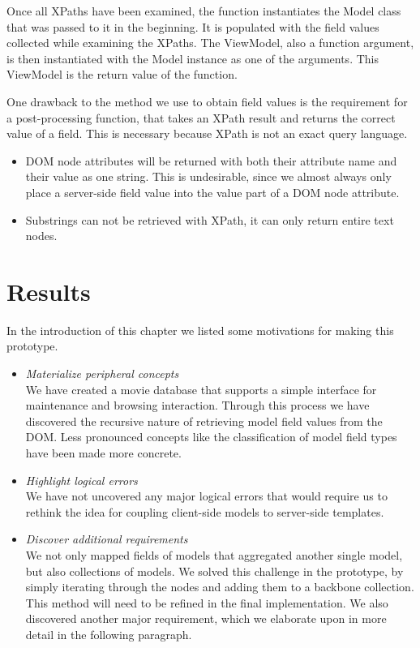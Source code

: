 \documentclass[thesis.tex]{subfiles}
\begin{document}
Once all XPaths have been examined, the function instantiates the Model class
that was passed to it in the beginning. It is populated with the field values
collected while examining the XPaths.
The ViewModel, also a function argument, is then instantiated with
the Model instance as one of the arguments.
This ViewModel is the return value of the function.

One drawback to the method we use to obtain field values is the requirement
for a post-processing function, that takes an XPath result and
returns the correct value of a field.
This is necessary because XPath is not an exact query language.
\begin{itemize}
	\item DOM node attributes will be returned with both their attribute name and
	their value as one string. This is undesirable, since we almost always only
	place a server-side field value into the value part of a DOM node attribute.
	\item Substrings can not be retrieved with XPath, it can only return entire
	text nodes.
\end{itemize}

\section{Results}
\label{sec:first:results}
In the introduction of this chapter we listed some motivations for making
this prototype.

\begin{itemize}
	\item \emph{Materialize peripheral concepts}\\
	We have created a movie database that supports a simple interface
	for maintenance and browsing interaction.
	Through this process we have discovered the recursive nature of retrieving
	model field values from the DOM.
	Less pronounced concepts like the classification of model field types have 
	been made more concrete.
	\item \emph{Highlight logical errors}\\
	We have not uncovered any major logical errors that would require us to
	rethink the idea for coupling client-side models to server-side templates.
	\item \emph{Discover additional requirements}\\
	We not only mapped fields of models that aggregated another single model,
	but also collections of models. We solved this challenge in the prototype,
	by simply iterating through the nodes and adding them to
	a backbone collection. This method will need to be refined in the final
	implementation.
	We also discovered another major requirement, which we elaborate upon in more
	detail in the following paragraph.
\end{itemize}
\end{document}
